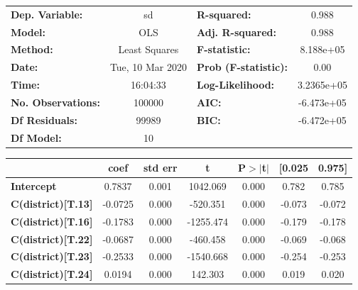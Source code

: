 \documentclass[]{article}
\begin{document}
\begin{table}[h!]
\begin{center}
\begin{tabular}{lclc}
\toprule
\textbf{Dep. Variable:}    &        sd        & \textbf{  R-squared:         } &     0.988   \\
\textbf{Model:}            &       OLS        & \textbf{  Adj. R-squared:    } &     0.988   \\
\textbf{Method:}           &  Least Squares   & \textbf{  F-statistic:       } & 8.188e+05   \\
\textbf{Date:}             & Tue, 10 Mar 2020 & \textbf{  Prob (F-statistic):} &     0.00    \\
\textbf{Time:}             &     16:04:33     & \textbf{  Log-Likelihood:    } & 3.2365e+05  \\
\textbf{No. Observations:} &      100000      & \textbf{  AIC:               } & -6.473e+05  \\
\textbf{Df Residuals:}     &       99989      & \textbf{  BIC:               } & -6.472e+05  \\
\textbf{Df Model:}         &          10      & \textbf{                     } &             \\
\bottomrule
\end{tabular}
\begin{tabular}{lcccccc}
                           & \textbf{coef} & \textbf{std err} & \textbf{t} & \textbf{P$> |$t$|$} & \textbf{[0.025} & \textbf{0.975]}  \\
\midrule
\textbf{Intercept}         &       0.7837  &        0.001     &  1042.069  &         0.000        &        0.782    &        0.785     \\
\textbf{C(district)[T.13]} &      -0.0725  &        0.000     &  -520.351  &         0.000        &       -0.073    &       -0.072     \\
\textbf{C(district)[T.16]} &      -0.1783  &        0.000     & -1255.474  &         0.000        &       -0.179    &       -0.178     \\
\textbf{C(district)[T.22]} &      -0.0687  &        0.000     &  -460.458  &         0.000        &       -0.069    &       -0.068     \\
\textbf{C(district)[T.23]} &      -0.2533  &        0.000     & -1540.668  &         0.000        &       -0.254    &       -0.253     \\
\textbf{C(district)[T.24]} &       0.0194  &        0.000     &   142.303  &         0.000        &        0.019    &        0.020     \\

\end{tabular}
\end{center}
\end{table}
\end{document}
